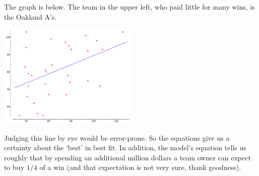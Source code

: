 The graph is below.
The team in the upper left, who paid little for many wins, is
the Oakland A's.

\begin{center}  \small
  \includegraphics[width=0.5\textwidth]{moneyball.pdf}
\end{center}

Judging this line by eye would be error-prone.
So the equations give us a certainty about the `best' in best fit.
In addition, the model's equation tells us roughly that 
by spending an additional million dollars
a team owner can expect to buy $1/4$ of a win
(and that expectation is not very sure, thank goodness).





